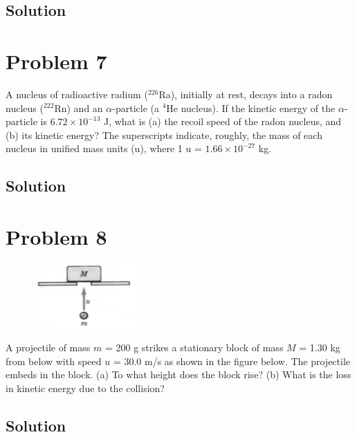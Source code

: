 \documentclass[12pt]{article}
\begin{document}
\subsection*{Solution}


\pagebreak
\section*{Problem 7}
A nucleus of radioactive radium ($^{226}$Ra), initially at rest, decays into a radon nucleus ($^{222}$Rn) and an $\alpha$-particle (a $^{4}$He nucleus). If the kinetic energy of the $\alpha$-particle is $6.72 \times 10^{-13}$ J, what is (a) the recoil speed of the radon nucleus, and (b) its kinetic energy? The superscripts indicate, roughly, the mass of each nucleus in unified mass units (u), where 1 u = $1.66 \times 10^{-27}$ kg.

\subsection*{Solution}


\pagebreak
\section*{Problem 8}
\begin{figure}
    \vspace{-30pt}
    \includegraphics[width=0.35\textwidth]{graph_8.png} 
\end{figure}
A projectile of mass $m$ = 200 g strikes a stationary block of mass $M$ = 1.30 kg from below with speed $u$ = 30.0 m/s as shown in the figure below. The projectile embeds in the block. (a) To what height does the block rise? (b) What is the loss in kinetic energy due to the collision?

\subsection*{Solution}
\end{document}
